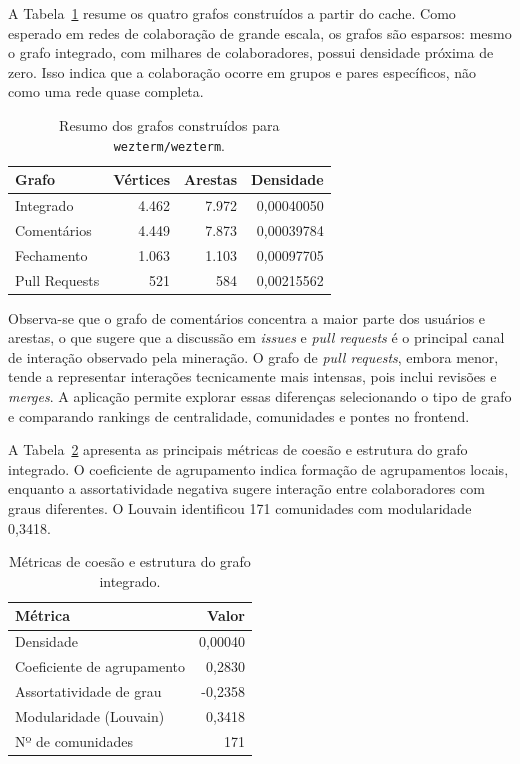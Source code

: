 \documentclass[12pt]{article}
\begin{document}
A Tabela~\ref{tab:resultados-grafos} resume os quatro grafos construídos a
partir do cache. Como esperado em redes de colaboração de grande escala, os
grafos são esparsos: mesmo o grafo integrado, com milhares de colaboradores,
possui densidade próxima de zero. Isso indica que a colaboração ocorre em grupos
e pares específicos, não como uma rede quase completa.

\begin{table}[ht]
\centering
\caption{Resumo dos grafos construídos para \texttt{wezterm/wezterm}.}
\label{tab:resultados-grafos}
\small
\begin{tabular}{lrrr}
\toprule
\textbf{Grafo} & \textbf{Vértices} & \textbf{Arestas} & \textbf{Densidade} \\
\midrule
Integrado & 4.462 & 7.972 & 0,00040050 \\
Comentários & 4.449 & 7.873 & 0,00039784 \\
Fechamento & 1.063 & 1.103 & 0,00097705 \\
Pull Requests & 521 & 584 & 0,00215562 \\
\bottomrule
\end{tabular}
\end{table}

Observa-se que o grafo de comentários concentra a maior parte dos usuários e
arestas, o que sugere que a discussão em \emph{issues} e \emph{pull requests} é
o principal canal de interação observado pela mineração. O grafo de
\emph{pull requests}, embora menor, tende a representar interações tecnicamente
mais intensas, pois inclui revisões e \emph{merges}. A aplicação permite explorar
essas diferenças selecionando o tipo de grafo e comparando rankings de
centralidade, comunidades e pontes no frontend.

A Tabela~\ref{tab:coesao-resultados} apresenta as principais métricas de coesão
e estrutura do grafo integrado. O coeficiente de agrupamento indica formação de
agrupamentos locais, enquanto a assortatividade negativa sugere interação entre
colaboradores com graus diferentes. O Louvain identificou 171 comunidades com
modularidade 0,3418.

\begin{table}[ht]
\centering
\caption{Métricas de coesão e estrutura do grafo integrado.}
\label{tab:coesao-resultados}
\scriptsize
\renewcommand{\arraystretch}{0.85}
\begin{tabular}{lr}
\toprule
\textbf{Métrica} & \textbf{Valor} \\
\midrule
Densidade & 0,00040 \\
Coeficiente de agrupamento & 0,2830 \\
Assortatividade de grau & -0,2358 \\
Modularidade (Louvain) & 0,3418 \\
Nº de comunidades & 171 \\
\bottomrule
\end{tabular}
\end{table}
\end{document}
